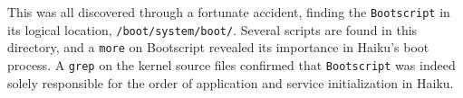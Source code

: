 \documentclass{article}
\begin{document}
This was all discovered through a fortunate accident, finding the \texttt{Bootscript} in its logical location, \texttt{/boot/system/boot/}. Several scripts are found in this directory, and a \texttt{more} on Bootscript revealed its importance in Haiku's boot process. A \texttt{grep} on the kernel source files confirmed that \texttt{Bootscript} was indeed solely responsible for the order of application and service initialization in Haiku.

{}

\end{document}
